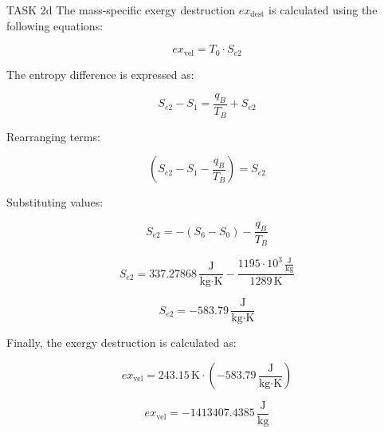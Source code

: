 TASK 2d  
The mass-specific exergy destruction \( ex_{\text{dest}} \) is calculated using the following equations:

\[
ex_{\text{vel}} = T_0 \cdot S_{e2}
\]

The entropy difference is expressed as:

\[
S_{e2} - S_1 = \frac{q_B}{T_B} + S_{e2}
\]

Rearranging terms:

\[
(S_{e2} - S_1 - \frac{q_B}{T_B}) = S_{e2}
\]

Substituting values:

\[
S_{e2} = - (S_6 - S_0) - \frac{q_B}{T_B}
\]

\[
S_{e2} = 337.27868 \, \frac{\text{J}}{\text{kg·K}} - \frac{1195 \cdot 10^3 \, \frac{\text{J}}{\text{kg}}}{1289 \, \text{K}}
\]

\[
S_{e2} = -583.79 \, \frac{\text{J}}{\text{kg·K}}
\]

Finally, the exergy destruction is calculated as:

\[
ex_{\text{vel}} = 243.15 \, \text{K} \cdot (-583.79 \, \frac{\text{J}}{\text{kg·K}})
\]

\[
ex_{\text{vel}} = -1413407.4385 \, \frac{\text{J}}{\text{kg}}
\]